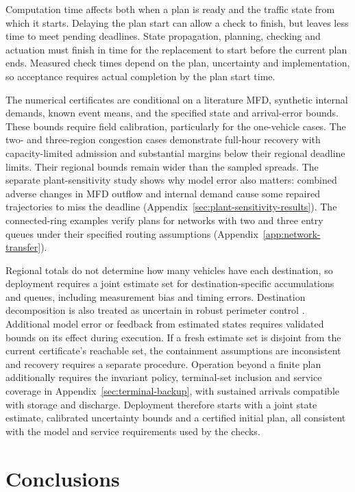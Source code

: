 \documentclass[final]{cas-sc}
\theoremstyle{definition}
\theoremstyle{plain}
\theoremstyle{definition}
\theoremstyle{plain}
\newcommand{\appref}[1]{Appendix~\ref{#1}}
\begin{document}
Computation time affects both when a plan is ready and the traffic state
from which it starts. Delaying the plan start can allow a check to finish,
but leaves less time to meet pending deadlines. State propagation,
planning, checking and actuation must finish in time for the replacement
to start before the current plan ends. Measured check times depend on
the plan, uncertainty and implementation, so acceptance requires actual
completion by the plan start time.

The numerical certificates are conditional on a literature MFD, synthetic
internal demands, known event means, and the specified state and
arrival-error bounds. These bounds
require field calibration, particularly for the one-vehicle cases. The
two- and three-region congestion cases demonstrate full-hour recovery
with capacity-limited admission and substantial margins below their
regional deadline limits. Their regional bounds remain wider than the
sampled spreads.
The separate plant-sensitivity study shows why model error also matters:
combined adverse changes in MFD outflow and internal demand cause some
repaired trajectories to miss the deadline
(\appref{sec:plant-sensitivity-results}). The connected-ring examples
verify plans for networks with two and three entry queues under their
specified routing assumptions (\appref{app:network-transfer}).

Regional totals do not determine how many vehicles have each destination,
so deployment requires a joint estimate set for destination-specific
accumulations and queues, including measurement bias and timing errors.
Destination decomposition is also treated as uncertain in robust perimeter
control \cite{haddad2015robust}. Additional model error or feedback from
estimated states requires validated bounds on its effect during execution.
If a fresh estimate set is disjoint from the current certificate's reachable
set, the containment assumptions are inconsistent and recovery requires a
separate procedure. Operation beyond a finite plan additionally requires
the invariant policy, terminal-set inclusion and service coverage in
\appref{sec:terminal-backup}, with sustained arrivals compatible with
storage and discharge. Deployment therefore starts with a joint state
estimate, calibrated uncertainty bounds and a certified initial plan,
all consistent with the model and service requirements used by the checks.

\section{Conclusions}
\label{sec:new-conclusion}
\end{document}
